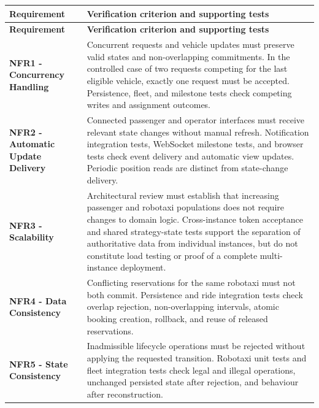 \documentclass[11pt,a4paper,oneside]{report}
\begin{document}
\begin{longtable}{@{}
    >{\raggedright\arraybackslash}p{}
    >{\raggedright\arraybackslash}p{}
@{}}
\toprule
\textbf{Requirement} & \textbf{Verification criterion and supporting tests} \\
\midrule
\endfirsthead

\toprule
\textbf{Requirement} & \textbf{Verification criterion and supporting tests} \\
\midrule
\endhead

\bottomrule
\endlastfoot

\textbf{NFR1 - Concurrency Handling}
&
Concurrent requests and vehicle updates must preserve valid states and
non-overlapping commitments. In the controlled case of two requests
competing for the last eligible vehicle, exactly one request must be
accepted. Persistence, fleet, and milestone tests check competing
writes and assignment outcomes.
\\

\textbf{NFR2 - Automatic Update Delivery}
&
Connected passenger and operator interfaces must receive relevant
state changes without manual refresh. Notification integration tests,
WebSocket milestone tests, and browser tests check event delivery and
automatic view updates. Periodic position reads are distinct from
state-change delivery.
\\

\textbf{NFR3 - Scalability}
&
Architectural review must establish that increasing passenger and
robotaxi populations does not require changes to domain logic.
Cross-instance token acceptance and shared strategy-state tests
support the separation of authoritative data from individual
instances, but do not constitute load testing or proof of a complete
multi-instance deployment.
\\

\textbf{NFR4 - Data Consistency}
&
Conflicting reservations for the same robotaxi must not both commit.
Persistence and ride integration tests check overlap rejection,
non-overlapping intervals, atomic booking creation, rollback, and
reuse of released reservations.
\\

\textbf{NFR5 - State Consistency}
&
Inadmissible lifecycle operations must be rejected without applying
the requested transition. Robotaxi unit tests and fleet integration
tests check legal and illegal operations, unchanged persisted state
after rejection, and behaviour after reconstruction.
\\


\end{longtable}
\end{document}
